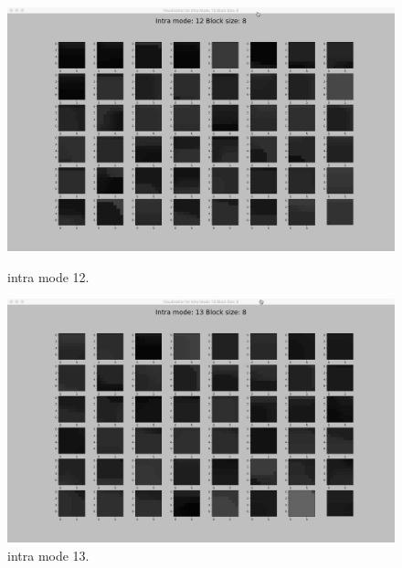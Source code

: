 \begin{figure}[H]
    \begin{minipage}{0.49\textwidth}
        \includegraphics[width=\linewidth]{Figures/visu-size8x8/8-12}
        \caption[Intra mode 12]{intra mode 12.}
        \label{fig:size8_mode12}
    \end{minipage}
    \hspace{\fill} %
    \begin{minipage}{0.49\textwidth}
        \includegraphics[width=\linewidth]{Figures/visu-size8x8/8-13}
        \caption[Intra mode 13]{intra mode 13.}
        \label{fig:size8_mode13}
    \end{minipage}
    
    \vspace*{1cm} %


\end{figure}
